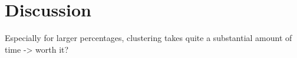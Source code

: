 \section{Discussion}
Especially for larger percentages, clustering takes quite a substantial amount
of time -> worth it?